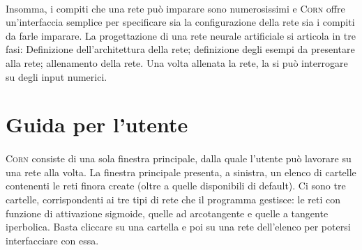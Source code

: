 \documentclass{article}
\begin{document}
\paragraph{} Insomma, i compiti che una rete può imparare sono numerosissimi e \textsc{Corn} offre un'interfaccia semplice per specificare sia la configurazione della rete sia i compiti da farle imparare. La progettazione di una rete neurale artificiale si articola in tre fasi: Definizione dell'architettura della rete; definizione degli esempi da presentare alla rete; allenamento della rete. Una volta allenata la rete, la si può interrogare su degli input numerici.




\section{Guida per l'utente}

\paragraph{} \textsc{Corn} consiste di una sola finestra principale, dalla quale l'utente può lavorare su una rete alla volta. La finestra principale presenta, a sinistra, un elenco di cartelle contenenti le reti finora create (oltre a quelle disponibili di default). Ci sono tre cartelle, corrispondenti ai tre tipi di rete che il programma gestisce: le reti con funzione di attivazione sigmoide, quelle ad arcotangente e quelle a tangente iperbolica. Basta cliccare su una cartella e poi su una rete dell'elenco per potersi interfacciare con essa.
\end{document}
